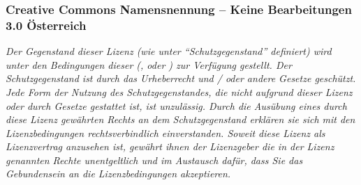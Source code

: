 % 
\subsubsection{Creative Commons Namensnennung --
Keine Bearbeitungen 3.0 Österreich}

\label{topic:lizenz}

{\FontSerifNarrowFamily\itshape\noindent
Der Gegenstand dieser Lizenz (wie unter
\enquote{Schutzgegenstand} definiert) wird unter
den Bedingungen dieser 
(,  oder
) zur Verfügung gestellt. Der
Schutzgegenstand ist durch das Urheberrecht und / oder
andere Gesetze geschützt. Jede Form der Nutzung des
Schutzgegenstandes, die nicht aufgrund dieser Lizenz oder
durch Gesetze gestattet ist, ist unzulässig. Durch die
Ausübung eines durch diese Lizenz gewährten Rechts an dem
Schutzgegenstand erklären sie sich mit den Lizenzbedingungen
rechtsverbindlich einverstanden. Soweit diese Lizenz als
Lizenzvertrag anzusehen ist, gewährt ihnen der Lizenzgeber
die in der Lizenz genannten Rechte unentgeltlich und im
Austausch dafür, dass Sie das Gebundensein an die
Lizenzbedingungen akzeptieren.
}

